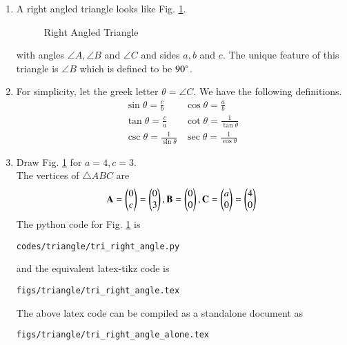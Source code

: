 \renewcommand{\theequation}{\theenumi}
\begin{enumerate}[label=\thesection.\arabic*.,ref=\thesection.\theenumi]
\item


A right angled triangle looks like Fig. \ref{fig:tri_right_angle}.
\begin{figure}[!ht]
\centering
\resizebox{\columnwidth}{!}{}
\caption{Right Angled Triangle}
\label{fig:tri_right_angle}	
\end{figure}
with angles $\angle A,\angle B$ and $\angle C$ and sides $a, b$ and $c$.  The unique feature of this triangle is $\angle B$ which is defined to be $90\degree$.
\item
	For simplicity, let the greek letter $\theta = \angle C$.  We have the following definitions.
\begin{equation}
\label{eq:tri_trig_defs}
\begin{matrix}
	\sin \theta = \frac{c}{b} & 	\cos \theta = \frac{a}{b} \\
	\tan \theta = \frac{c}{a} & \cot \theta = \frac{1}{\tan \theta} \\
	\csc \theta = \frac{1}{\sin \theta} & \sec \theta = \frac{1}{\cos \theta}
	\end{matrix}
\end{equation}
%
\iffalse
\item Draw Fig. \ref{fig:tri_right_angle} for $a = 4, c =3$.
\label{const:tri_right_angle}
%
\\
\solution The vertices of $\triangle ABC$ are 
\begin{align}
\mathbf{A} = \begin{pmatrix}0\\c\end{pmatrix} = \begin{pmatrix}0\\3\end{pmatrix}, \mathbf{B} = \begin{pmatrix}0\\0\end{pmatrix}, \mathbf{C} = \begin{pmatrix}a\\0\end{pmatrix}=\begin{pmatrix}4\\0\end{pmatrix}
\end{align}
%
The python code for  Fig. \ref{fig:tri_right_angle} is
\begin{lstlisting}
codes/triangle/tri_right_angle.py
\end{lstlisting}
%
and the equivalent latex-tikz code is
%
\begin{lstlisting}
figs/triangle/tri_right_angle.tex
\end{lstlisting}
%
The above latex code can be compiled as a standalone document as
%
\begin{lstlisting}
figs/triangle/tri_right_angle_alone.tex

\end{lstlisting}
\end{enumerate}
